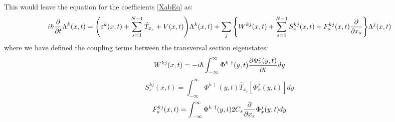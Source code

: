 \documentclass[11pt, a4paper]{article} %
\begin{document}
This would leave the equation for the coefficients \eqref{XabEq} as:
\begin{equation}\label{XabEq}
i\hbar \pdv{}{t}\Lambda^k(x,t) = \qty( \varepsilon^k(x,t) + \sum_{s=1}^{N-1}\hat{T}_{x_s}+V(x,t))\Lambda^k(x,t)+ \sum_j \qty{ W^{kj}(x,t) + \sum_{s=1}^{N-1} S^{kj}_s(x,t)+F^{kj}_s(x,t)\pdv{}{x_s} } \Lambda^j(x,t) 
\end{equation}
where we have defined the coupling terms between the transversal section eigenstates:
\begin{equation}
W^{kj}(x,t) = -i\hbar\int_{-\infty}^{\infty}\Phi^{k\ \dagger}(y,t) \pdv{\Phi^j_x(y,t)}{t} dy
\end{equation}
\begin{equation}
S^{kj}_s(x,t) = \int_{-\infty}^{\infty}\Phi^{k\ \dagger}(y,t) \hat{T}_{x_s} [\Phi^j_x(y,t)] dy
\end{equation}
\begin{equation}
F^{kj}_s(x,t) = \int_{-\infty}^{\infty}\Phi^{k\ \dagger}(y,t) 2C_s \pdv{}{x_s}\Phi^j_x(y,t) dy
\end{equation}
\end{document}
